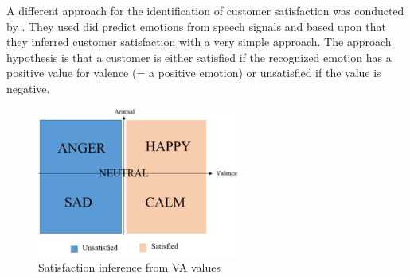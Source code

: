 \newline\newline
A different approach for the identification of customer satisfaction was conducted by \citet{Kamaruddin:2016:MeasuringCustomerSatisfaction}. They used did predict emotions from speech signals and based upon that they inferred customer satisfaction with a very simple approach. The approach hypothesis is that a customer is either satisfied if the recognized emotion has a positive value for valence (= a positive emotion) or unsatisfied if the value is negative.

\begin{figure}[H]
  \begin{center}
  \includegraphics[angle=0, width=0.6\textwidth]{Figures/Satisfaction_from_VA.PNG}
  \caption{Satisfaction inference from VA values}
  \label{fig:SatisfactionFromVA}
  \end{center}
\end{figure}

